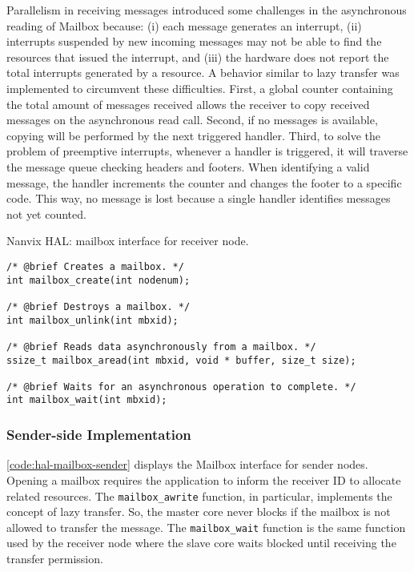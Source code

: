 					Parallelism in receiving messages introduced some challenges in the
					asynchronous reading of Mailbox because: (i) each message generates an
					interrupt, (ii) interrupts suspended by new incoming messages may
					not be able to find the \dnoc resources that issued the interrupt,
					and (iii) the hardware does not report the total interrupts generated
					by a resource. A behavior similar to lazy transfer was implemented
					to circumvent these difficulties.
					First, a global counter containing the total amount of messages
					received allows the receiver to copy received messages on the
					asynchronous read call. Second, if no messages is available, copying
					will be performed by the next triggered handler. Third, to solve the
					problem of preemptive interrupts, whenever a handler is triggered,
					it will traverse the message queue checking headers and footers.
					When identifying a valid message, the handler increments the counter
					and changes the footer to a specific code. This way, no message is
					lost because a single handler identifies messages not yet counted.

\begin{listing}[!tb]
\caption{Nanvix HAL: mailbox interface for receiver node.}
\label{code:hal-mailbox-receiver}
\begin{verbatim}
/* @brief Creates a mailbox. */
int mailbox_create(int nodenum);

/* @brief Destroys a mailbox. */
int mailbox_unlink(int mbxid);

/* @brief Reads data asynchronously from a mailbox. */
ssize_t mailbox_aread(int mbxid, void * buffer, size_t size);

/* @brief Waits for an asynchronous operation to complete. */
int mailbox_wait(int mbxid);
\end{verbatim}
\end{listing}

			\subsubsection{Sender-side Implementation}

				\autoref{code:hal-mailbox-sender} displays the Mailbox interface for
				sender nodes. Opening a mailbox requires the application to inform
				the receiver ID to allocate related resources. The \texttt{mailbox\_awrite} function,
				in particular, implements the concept of lazy transfer. So, the master
				core never blocks if the mailbox is not allowed to transfer the message.
				The \texttt{mailbox\_wait} function is the same function used by the receiver node where
				the slave core waits blocked until receiving the transfer permission.

